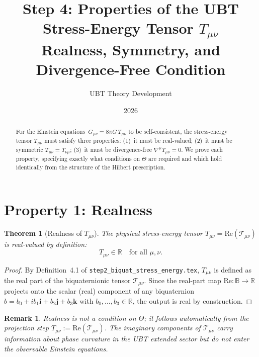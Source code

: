 \documentclass[12pt]{article}
\title{Step 4: Properties of the UBT Stress-Energy Tensor $T_{\mu\nu}$\\
\large Realness, Symmetry, and Divergence-Free Condition}
\author{UBT Theory Development}
\date{2026}
\newtheorem{theorem}[definition]{Theorem}
\newtheorem{remark}[definition]{Remark}
\newcommand{\re}{\mathrm{Re}}
\begin{document}
\maketitle

\begin{abstract}
For the Einstein equations~$G_{\mu\nu} = 8\pi G\,T_{\mu\nu}$ to be
self-consistent, the stress-energy tensor $T_{\mu\nu}$ must satisfy three
properties: (1)~it must be real-valued; (2)~it must be symmetric
$T_{\mu\nu} = T_{\nu\mu}$; (3)~it must be divergence-free
$\nabla^\mu T_{\mu\nu} = 0$.  We prove each property, specifying exactly
what conditions on $\Theta$ are required and which hold identically from
the structure of the Hilbert prescription.
\end{abstract}

\tableofcontents

\section{Property 1: Realness}

\begin{theorem}[Realness of $T_{\mu\nu}$]
\label{thm:real}
The physical stress-energy tensor $T_{\mu\nu} = \re(\mathcal{T}_{\mu\nu})$
is real-valued by definition:
\begin{equation}
  T_{\mu\nu} \in \mathbb{R} \quad \text{for all } \mu,\nu.
\end{equation}
\end{theorem}

\begin{proof}
  By Definition~4.1 of \texttt{step2\_biquat\_stress\_energy.tex},
  $T_{\mu\nu}$ is defined as the real part of the biquaternionic tensor
  $\mathcal{T}_{\mu\nu}$.  Since the real-part map
  $\re: \mathbb{B} \to \mathbb{R}$ projects onto the scalar (real)
  component of any biquaternion $b = b_0 + ib_1\mathbf{i} + b_2\mathbf{j}
  + b_3\mathbf{k}$ with $b_0,\ldots,b_3 \in \mathbb{R}$, the output is
  real by construction.
\end{proof}

\begin{remark}
  Realness is not a condition on $\Theta$; it follows automatically from
  the projection step $T_{\mu\nu} := \re(\mathcal{T}_{\mu\nu})$.
  The imaginary components of $\mathcal{T}_{\mu\nu}$ carry information
  about phase curvature in the UBT extended sector but do not enter
  the observable Einstein equations.
\end{remark}
\end{document}

